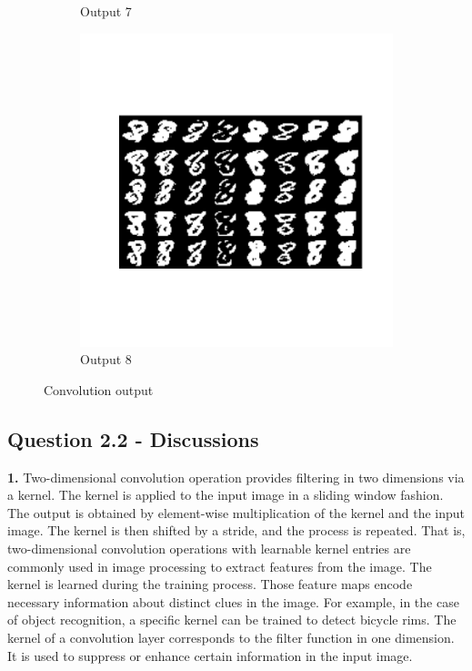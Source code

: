 \documentclass{assignment}
\begin{document}
\begin{figure}[!htb]
\begin{subfigure}{0.3\textwidth}
        \caption{Output 7}
    \end{subfigure}\hfill
    \begin{subfigure}{0.3\textwidth}
        \includegraphics[width=\textwidth]{figures/out_8.png}
        \caption{Output 8}
    \end{subfigure}
        
    \caption{Convolution output}
    \label{fig:convolution_out}
\end{figure}

\subsection*{Question 2.2 - Discussions}
\textbf{1.}
Two-dimensional convolution operation provides filtering in two dimensions via a kernel. The kernel is applied to the input image in a sliding window fashion. The output is obtained by element-wise multiplication of the kernel and the input image. The kernel is then shifted by a stride, and the process is repeated. That is, two-dimensional convolution operations with learnable kernel entries are commonly used in image processing to extract features from the image. The kernel is learned during the training process. Those feature maps encode necessary information about distinct clues in the image. For example, in the case of object recognition, a specific kernel can be trained to detect bicycle rims. 
The kernel of a convolution layer corresponds to the filter function in one dimension. It is used to suppress or enhance certain information in the input image.
\end{document}

